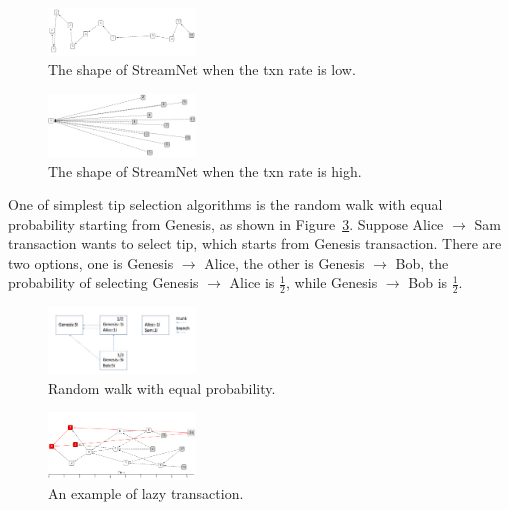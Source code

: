 \begin{figure}[!ht]
\begin{center}
\includegraphics[width=0.35\textwidth]{figures/slow_txn.png}
    \caption{
        The shape of StreamNet when the txn rate is low. 
     }
\label{slow_txn}
\end{center}
\end{figure}

\begin{figure}[!ht]
\begin{center}
\includegraphics[width=0.35\textwidth]{figures/fast_txn.png}
    \caption{
        The shape of StreamNet when the txn rate is high. 
     }
\label{fast_txn}
\end{center}
\end{figure}

One of simplest tip selection algorithms is the random walk with equal probability starting from Genesis, as shown in Figure~\ref{random_equal}.
Suppose Alice $\rightarrow$ Sam transaction wants to select tip, which starts from Genesis transaction.
There are two options, one is Genesis $\rightarrow$ Alice, the other is Genesis $\rightarrow$ Bob,
the probability of selecting Genesis $\rightarrow$ Alice is $\frac{1}{2}$, while Genesis $\rightarrow$ Bob is $\frac{1}{2}$. 

\begin{figure}[!ht]
\begin{center}
\includegraphics[width=0.35\textwidth]{figures/random_equal.png}
    \caption{
        Random walk with equal probability.
     }
\label{random_equal}
\end{center}
\end{figure}

\begin{figure}[!ht]
\begin{center}
\includegraphics[width=0.35\textwidth]{figures/lazy_txn.png}
    \caption{
        An example of lazy transaction.
     }
\label{lazy_txn}
\end{center}
\end{figure}

